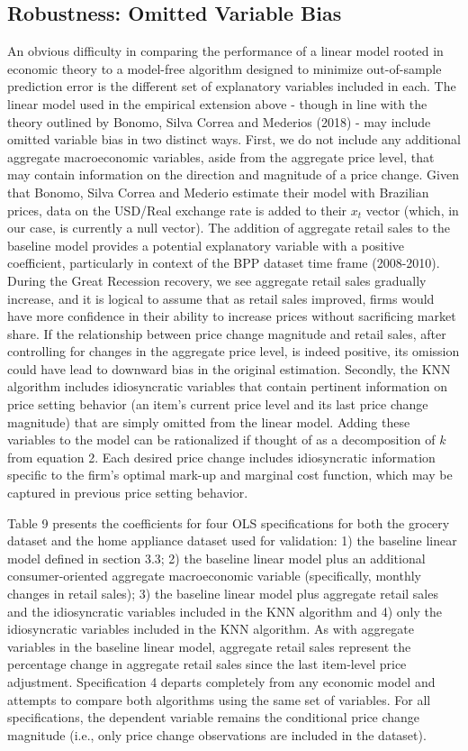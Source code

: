 \documentclass[11pt]{article}
\begin{document}
\subsection{Robustness: Omitted Variable Bias}

An obvious difficulty in comparing the performance of a linear model rooted in economic theory to a model-free algorithm designed to minimize out-of-sample prediction error is the different set of explanatory variables included in each. The linear model used in the empirical extension above - though in line with the theory outlined by Bonomo,  Silva  Correa  and  Mederios  (2018) - may include omitted variable bias in two distinct ways. First, we do not include any additional aggregate macroeconomic variables, aside from the aggregate price level, that may contain information on the direction and magnitude of a price change.  Given that Bonomo,  Silva  Correa  and  Mederio estimate their model with Brazilian prices, data on the USD/Real exchange rate is added to their $x_{t}$ vector (which, in our case, is currently a null vector). The addition of aggregate retail sales to the baseline model provides a potential explanatory variable with a positive coefficient, particularly in context of the BPP dataset time frame (2008-2010). During the Great Recession recovery, we see aggregate retail sales gradually increase, and it is logical to assume that as retail sales improved, firms would have more confidence in their ability to increase prices without sacrificing market share. If the relationship between price change magnitude and retail sales, after controlling for changes in the aggregate price level, is indeed positive, its omission could have lead to downward bias in the original estimation. Secondly, the KNN algorithm includes idiosyncratic variables that contain pertinent information on price setting behavior (an item's current price level and its last price change magnitude) that are simply omitted from the linear model. Adding these variables to the model can be rationalized if thought of as a decomposition of $k$ from equation 2. Each desired price change includes idiosyncratic information specific to the firm's optimal mark-up and marginal cost function, which may be captured in previous price setting behavior.

Table 9 presents the coefficients for four OLS specifications for both the grocery dataset and the home appliance dataset used for validation: 1) the baseline linear model defined in section 3.3; 2) the baseline linear model plus an additional consumer-oriented aggregate macroeconomic variable (specifically, monthly changes in retail sales); 3) the baseline linear model plus aggregate retail sales and the idiosyncratic variables included in the KNN algorithm and 4) only the idiosyncratic variables included in the KNN algorithm. As with aggregate variables in the baseline linear model, aggregate retail sales represent the percentage change in aggregate retail sales since the last item-level price adjustment. Specification 4 departs completely from any economic model and attempts to compare both algorithms using the same set of variables. For all specifications, the dependent variable remains the conditional price change magnitude (i.e., only price change observations are included in the dataset).
\end{document}
